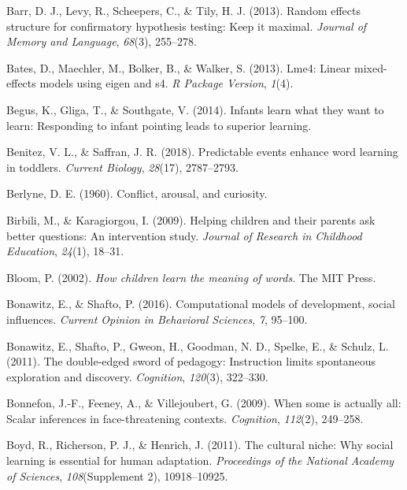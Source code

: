 \documentclass[oneside]{report}
\begin{document}
\hypertarget{ref-barr2013random}{}
Barr, D. J., Levy, R., Scheepers, C., \& Tily, H. J. (2013). Random
effects structure for confirmatory hypothesis testing: Keep it maximal.
\emph{Journal of Memory and Language}, \emph{68}(3), 255--278.

\hypertarget{ref-bates2013lme4}{}
Bates, D., Maechler, M., Bolker, B., \& Walker, S. (2013). Lme4: Linear
mixed-effects models using eigen and s4. \emph{R Package Version},
\emph{1}(4).

\hypertarget{ref-begus2014infants}{}
Begus, K., Gliga, T., \& Southgate, V. (2014). Infants learn what they
want to learn: Responding to infant pointing leads to superior learning.

\hypertarget{ref-benitez2018predictable}{}
Benitez, V. L., \& Saffran, J. R. (2018). Predictable events enhance
word learning in toddlers. \emph{Current Biology}, \emph{28}(17),
2787--2793.

\hypertarget{ref-berlyne1960conflict}{}
Berlyne, D. E. (1960). Conflict, arousal, and curiosity.

\hypertarget{ref-birbili2009helping}{}
Birbili, M., \& Karagiorgou, I. (2009). Helping children and their
parents ask better questions: An intervention study. \emph{Journal of
Research in Childhood Education}, \emph{24}(1), 18--31.

\hypertarget{ref-bloom2002children}{}
Bloom, P. (2002). \emph{How children learn the meaning of words}. The
MIT Press.

\hypertarget{ref-bonawitz2016computational}{}
Bonawitz, E., \& Shafto, P. (2016). Computational models of development,
social influences. \emph{Current Opinion in Behavioral Sciences},
\emph{7}, 95--100.

\hypertarget{ref-bonawitz2011double}{}
Bonawitz, E., Shafto, P., Gweon, H., Goodman, N. D., Spelke, E., \&
Schulz, L. (2011). The double-edged sword of pedagogy: Instruction
limits spontaneous exploration and discovery. \emph{Cognition},
\emph{120}(3), 322--330.

\hypertarget{ref-bonnefon2009}{}
Bonnefon, J.-F., Feeney, A., \& Villejoubert, G. (2009). When some is
actually all: Scalar inferences in face-threatening contexts.
\emph{Cognition}, \emph{112}(2), 249--258.

\hypertarget{ref-boyd2011cultural}{}
Boyd, R., Richerson, P. J., \& Henrich, J. (2011). The cultural niche:
Why social learning is essential for human adaptation. \emph{Proceedings
of the National Academy of Sciences}, \emph{108}(Supplement 2),
10918--10925.
\end{document}
